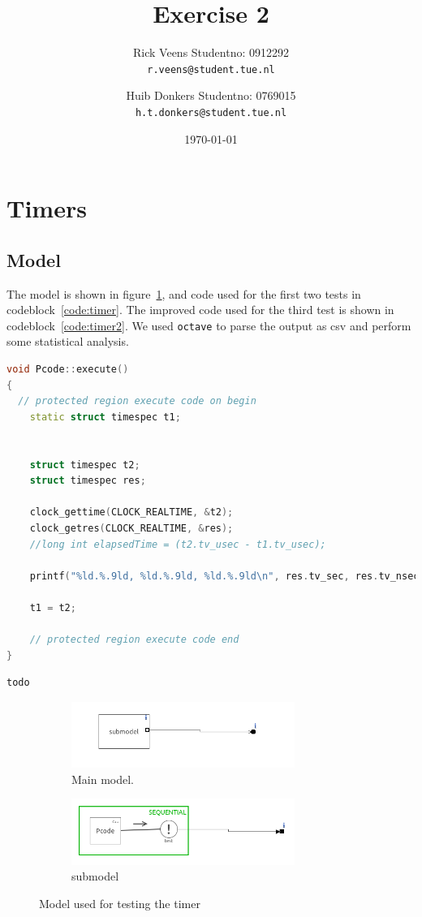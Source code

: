 \documentclass[a4paper,twoside,11pt]{article}
\title{\vspace{-\baselineskip}\sffamily\bfseries Exercise 2}
\author{
	Rick Veens \qquad Studentno: 0912292\\
	\texttt{r.veens@student.tue.nl}
	\and
	Huib Donkers \qquad Studentno: 0769015\\
	\texttt{h.t.donkers@student.tue.nl}
}
\date{\today}
\begin{document}
\maketitle

\section{Timers}
\subsection{Model}
The model is shown in figure~\ref{fig:timermodel}, and code used for the first two tests in codeblock~\ref{code:timer}. The improved code used for the third test is shown in codeblock~\ref{code:timer2}. We used \texttt{octave} to parse the output as csv and perform some statistical analysis.

\begin{lstlisting}[caption=Pcode::execute, label=code:timer, language=C++]
void Pcode::execute()
{
  // protected region execute code on begin
	static struct timespec t1;


	struct timespec t2;
	struct timespec res;

	clock_gettime(CLOCK_REALTIME, &t2);
	clock_getres(CLOCK_REALTIME, &res);
	//long int elapsedTime = (t2.tv_usec - t1.tv_usec);

	printf("%ld.%.9ld, %ld.%.9ld, %ld.%.9ld\n", res.tv_sec, res.tv_nsec, t2.tv_sec, t2.tv_nsec, t1.tv_sec, t1.tv_nsec);

	t1 = t2;

	// protected region execute code end
}
\end{lstlisting}
\begin{lstlisting}[caption=Pcode::execute (improved), label=code:timer2, language=C++]
todo
\end{lstlisting}

\begin{figure}
 \centering
 \begin{subfigure}{\textwidth}
  \centering
  \includegraphics[width=0.8\textwidth]{./img/timer-mainmodel.png}
  \caption{Main model.}
 \end{subfigure}
 \begin{subfigure}{\textwidth}
  \centering
  \includegraphics[width=0.8\textwidth]{./img/timer-submodel.png}
  \caption{submodel}
 \end{subfigure}
 \caption{Model used for testing the timer}
 \label{fig:timermodel}
\end{figure}
\end{document}
